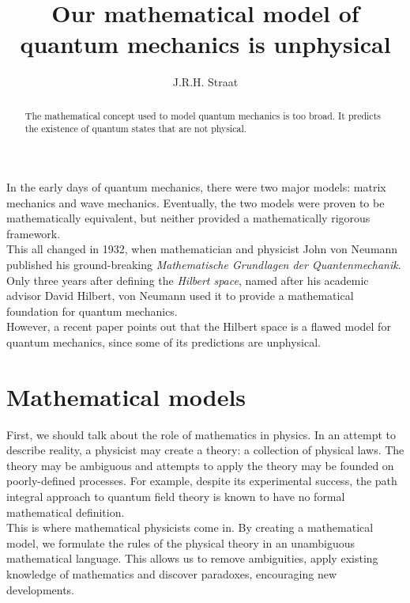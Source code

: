 \documentclass[12pt]{article}
\title{Our mathematical model of quantum mechanics is unphysical}      %
\author{J.R.H. Straat}
\date{}
\begin{document}
\renewcommand{\abstractname}{}
\maketitle
%
\begin{abstract}
	The mathematical concept used to model quantum mechanics is too broad. It predicts the existence of quantum states that are not physical.
\end{abstract}
%
\begin{multicols}{2}
    In the early days of quantum mechanics, there were two major models: matrix mechanics and wave mechanics. Eventually, the two models were proven to be mathematically equivalent, but neither provided a mathematically rigorous framework.\\
    This all changed in 1932, when mathematician and physicist John von Neumann published his ground-breaking \textit{Mathematische Grundlagen der Quantenmechanik}\cite{von_neumann_mathematische_1996}. Only three years after defining the \textit{Hilbert space}, named after his academic advisor David Hilbert, von Neumann used it to provide a mathematical foundation for quantum mechanics.\\
    However, a recent paper\cite{carcassi_unphysicality_2023} points out that the Hilbert space is a flawed model for quantum mechanics, since some of its predictions are unphysical.
    \section*{Mathematical models}
    First, we should talk about the role of mathematics in physics. In an attempt to describe reality, a physicist may create a theory: a collection of physical laws. The theory may be ambiguous and attempts to apply the theory may be founded on poorly-defined processes. For example, despite its experimental success, the path integral approach to quantum field theory is known to have no formal mathematical definition.\\
    This is where mathematical physicists come in. By creating a mathematical model, we formulate the rules of the physical theory in an unambiguous mathematical language. This allows us to remove ambiguities, apply existing knowledge of mathematics and discover paradoxes, encouraging new developments.

\end{multicols}
\end{document}
